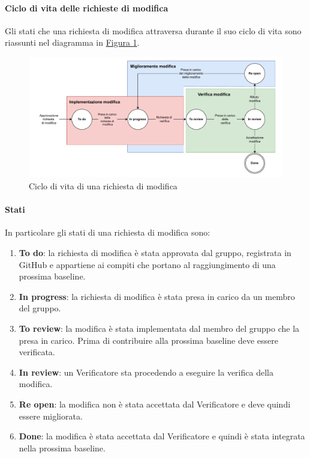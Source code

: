 \paragraph{Ciclo di vita delle richieste di modifica}
\label{par:ciclo_vita_richieste_di_modifica}
Gli stati che una richiesta di modifica attraversa durante il suo ciclo di vita sono riassunti nel diagramma in \hyperref[fig:ciclo_di_vita_modifiche_documenti]{Figura \ref{fig:ciclo_di_vita_modifiche_documenti}}.
\begin{figure}[h!]
    \center
    \includegraphics[scale=0.6]{Sezioni/ProcessiDiSupporto/Immagini/lifecycle_modifica.pdf}
    \caption{Ciclo di vita di una richiesta di modifica}
    \label{fig:ciclo_di_vita_modifiche_documenti}
\end{figure}

\paragraph{Stati}
In particolare gli stati di una richiesta di modifica sono:
\begin{enumerate}
    \item \textbf{To do}: la richiesta di modifica è stata approvata dal gruppo, registrata in GitHub e appartiene ai compiti che portano al raggiungimento di una prossima baseline.
    \item \textbf{In progress}: la richiesta di modifica è stata presa in carico da un membro del gruppo.
    \item \textbf{To review}: la modifica è stata implementata dal membro del gruppo che la presa in carico.
    Prima di contribuire alla prossima baseline deve essere verificata.
    \item \textbf{In review}: un Verificatore sta procedendo a eseguire la verifica della modifica.
    \item \textbf{Re open}: la modifica non è stata accettata dal Verificatore e deve quindi essere migliorata.
    \item \textbf{Done}: la modifica è stata accettata dal Verificatore e quindi è stata integrata nella prossima baseline. 
\end{enumerate}

